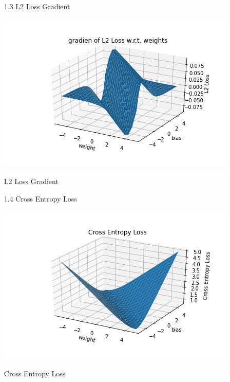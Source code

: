 \documentclass{article}
\begin{document}
\begin{enumerate}
        \newpage
        \item[1.3] 
    	L2 Loss Gradient\\
    	\begin{minipage}[t]{\linewidth}
        	\captionsetup{type=figure}
            \centering
            \includegraphics[width=0.65\linewidth]{gradien of L2 Loss w.r.t. weights.png}
            \caption{L2 Loss Gradient} 
            \label{L2 Loss Gradient}     
        \end{minipage}
        
        \item[1.4] 
    	Cross Entropy Loss\\
    	\begin{minipage}[t]{\linewidth}
        	\captionsetup{type=figure}
            \centering
            \includegraphics[width=0.65\linewidth]{Cross Entropy Loss.png}
            \caption{Cross Entropy Loss} 
            \label{Cross Entropy Loss}     
        \end{minipage}
        

\end{enumerate}
\end{document}

